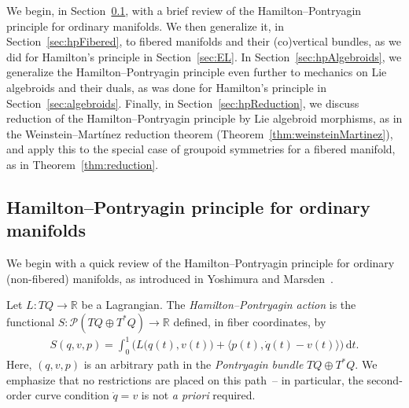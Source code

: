 \documentclass[10pt,a4paper]{amsart}
\numberwithin{equation}{section}
\begin{document}
We begin, in Section~\ref{sec:hpReview}, with a brief review of the Hamilton--Pontryagin principle for ordinary manifolds. We then generalize it, in Section~\ref{sec:hpFibered}, to f\/ibered manifolds and their (co)vertical bundles, as we did for Hamilton's principle in Section~\ref{sec:EL}. In Section~\ref{sec:hpAlgebroids}, we generalize the Hamilton--Pontryagin principle even further to mechanics on Lie algebroids and their duals, as was done for Hamilton's principle in Section~\ref{sec:algebroids}. Finally, in Section~\ref{sec:hpReduction}, we discuss reduction of the Hamilton--Pontryagin principle by Lie algebroid morphisms, as in the Weinstein--Mart\'inez reduction theorem (Theorem~\ref{thm:weinsteinMartinez}), and apply this to the special case of groupoid symmetries for a f\/ibered manifold, as in Theorem~\ref{thm:reduction}.

\subsection{Hamilton--Pontryagin principle for ordinary manifolds}\label{sec:hpReview}

We begin with a quick review of the Hamilton--Pontryagin principle for ordinary (non-f\/ibered) manifolds, as introduced in Yoshimura and Marsden~\cite{YoMa2006b}.

Let $ L \colon T Q \rightarrow \mathbb{R} $ be a Lagrangian. The \emph{Hamilton--Pontryagin action} is the functional $ S \colon \mathcal{P} ( T Q \oplus T ^\ast Q ) \rightarrow \mathbb{R} $ def\/ined, in f\/iber coordinates, by
\begin{gather*}
 S ( q, v , p ) = \int _0 ^1 \bigl( L \bigl( q (t) , v (t) \bigr) + \bigl\langle p (t) , \dot{q} (t) - v (t) \bigr\rangle \bigr) \,\mathrm{d}t .
\end{gather*}
Here, $ ( q, v, p ) $ is an arbitrary path in the \emph{Pontryagin bundle} $ T Q \oplus T ^\ast Q $. We emphasize that no restrictions are placed on this path~-- in particular, the second-order curve condition $ \dot{q} = v $ is not \emph{a priori} required.
\end{document}
